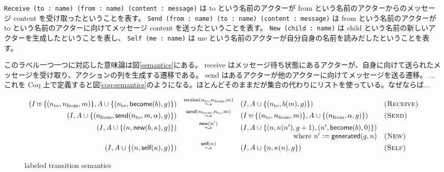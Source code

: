 \texttt{Receive (to : name) (from : name) (content : message)} は to という名前のアクターが from という名前のアクターからのメッセージ content を受け取ったということを表す。
\texttt{Send (from : name) (to : name) (content : message)} は from という名前のアクターが to という名前のアクターに向けてメッセージ content を送ったということを表す。
\texttt{New (child : name)} は child という名前の新しいアクターを生成したということを表し、
\texttt{Self (me : name)} は me という名前のアクターが自分自身の名前を読みだしたということを表す。

このラベル一つ一つに対応した意味論は図\ref{semantics}にある。
receive はメッセージ待ち状態にあるアクターが、自身に向けて送られたメッセージを受け取り、アクションの列を生成する遷移である。
send はあるアクターが他のアクターに向けてメッセージを送る遷移。
...
これを Coq 上で定義すると図\ref{coq:semantics}のようになる。ほとんどそのままだが集合の代わりにリストを使っている。なぜならば...

\begin{figure*}[t]
  \begin{displaymath}
    \begin{array}{rcll}
      (I \uplus \{(n_{\textrm{to}}, n_{\textrm{from}}, m)\}, A \cup \{(n_{\textrm{to}}, \textsf{become}(b), g)\}) &
      \overset{\textsf{receive}(n_{\textrm{to}}, n_{\textrm{from}}, m)}{\leadsto} &
      (I, A \cup \{(n_{\textrm{to}}, b(m), g)\}) &
      \textsc{(Receive)} \\

      (I, A \cup \{(n_{\textrm{from}}, \textsf{send}(n_{\textrm{to}}, m, \alpha), g)\}) &
      \overset{\textsf{send}(n_{\textrm{from}}, n_{\textrm{to}}, m)}{\leadsto} &
      (I \uplus \{(n_{\textrm{to}}, n_{\textrm{from}}, m)\}, A \cup \{(n_{\textrm{from}}, \alpha, g)\}) &
      \textsc{(Send)} \\

      (I, A \cup \{(n, \textsf{new}(b, \kappa), g)\}) &
      \overset{\textsf{new}(n')}{\leadsto} &
      (I, A \cup \{(n, \kappa(n'), g + 1), (n', \textsf{become}(b), 0)\}) & \\
      & & \hfill \textrm{where}\ n' := \textsf{generated}(g, n) &
      \textsc{(New)} \\

      (I, A \cup \{(n, \textsf{self}(\kappa), g)\}) &
      \overset{\textsf{self}(n)}{\leadsto} &
      (I, A \cup \{n, \kappa(n), g\}) &
      \textsc{(Self)}
    \end{array}
  \end{displaymath}
  \caption{labeled transition semantics}\label{fig:semantics}
\end{figure*}
